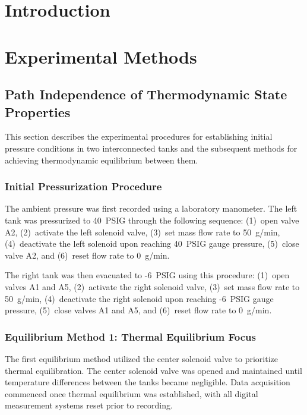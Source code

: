 \documentclass{article} %
\begin{document}
\begin{multicols}{2}


\section{Introduction}
\label{introduction}

\section{Experimental Methods}
\label{experimental_methods}

\subsection{Path Independence of Thermodynamic State Properties}
\label{methods_path_independencies_thermodynamic_properties}

This section describes the experimental procedures for establishing initial pressure conditions in two interconnected tanks and the subsequent methods for achieving thermodynamic equilibrium between them.

\subsubsection{Initial Pressurization Procedure}

The ambient pressure was first recorded using a laboratory manometer. The left tank was pressurized to 40~PSIG through the following sequence: (1)~open valve A2, (2)~activate the left solenoid valve, (3)~set mass flow rate to 50~g/min, (4)~deactivate the left solenoid upon reaching 40~PSIG gauge pressure, (5)~close valve A2, and (6)~reset flow rate to 0~g/min.

The right tank was then evacuated to -6~PSIG using this procedure: (1)~open valves A1 and A5, (2)~activate the right solenoid valve, (3)~set mass flow rate to 50~g/min, (4)~deactivate the right solenoid upon reaching -6~PSIG gauge pressure, (5)~close valves A1 and A5, and (6)~reset flow rate to 0~g/min.

\subsubsection{Equilibrium Method 1: Thermal Equilibrium Focus}

The first equilibrium method utilized the center solenoid valve to prioritize thermal equilibration. The center solenoid valve was opened and maintained until temperature differences between the tanks became negligible. Data acquisition commenced once thermal equilibrium was established, with all digital measurement systems reset prior to recording.


\end{multicols}
\end{document}
